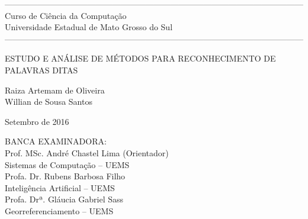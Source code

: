 \thispagestyle{plain}
\begin{center}

------------------------------------------------------------------------------------------------------------
\normalsize{Curso de Ciência da Computação \\ Universidade Estadual de Mato Grosso do Sul}
------------------------------------------------------------------------------------------------------------

\vspace*{2cm}

\LARGE{ESTUDO E ANÁLISE DE MÉTODOS PARA RECONHECIMENTO DE PALAVRAS DITAS}


\vspace*{1.5cm}
\normalsize{Raiza Artemam de Oliveira \\ Willian de Sousa Santos}

\vspace*{1.5cm}

\normalsize{Setembro de 2016}

\vspace*{3cm}
\end{center}
\begin{flushleft}
\begin{minipage}{0.5\textwidth}
\normalsize{
BANCA EXAMINADORA:\\


Prof. MSc. André Chastel Lima (Orientador) \\
Sistemas de Computação – UEMS\\



Profa. Dr.  Rubens Barbosa Filho \\
Inteligência Artificial – UEMS\\


 Profa. Drª.  Gláucia Gabriel Sass \\
Georreferenciamento – UEMS 
}
\end{minipage}
\end{flushleft}

